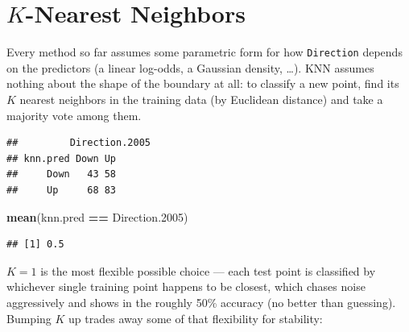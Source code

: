\documentclass[
  11pt,
]{article}
\newenvironment{Shaded}{\begin{snugshade}}{\end{snugshade}}
\newcommand{\AttributeTok}[1]{\textcolor[rgb]{0.13,0.29,0.53}{#1}}
\newcommand{\DecValTok}[1]{\textcolor[rgb]{0.00,0.00,0.81}{#1}}
\newcommand{\FloatTok}[1]{\textcolor[rgb]{0.00,0.00,0.81}{#1}}
\newcommand{\FunctionTok}[1]{\textcolor[rgb]{0.13,0.29,0.53}{\textbf{#1}}}
\newcommand{\NormalTok}[1]{#1}
\newcommand{\OtherTok}[1]{\textcolor[rgb]{0.56,0.35,0.01}{#1}}
\newcommand{\SpecialCharTok}[1]{\textcolor[rgb]{0.81,0.36,0.00}{\textbf{#1}}}
\begin{document}
\section{\texorpdfstring{\(K\)-Nearest
Neighbors}{K-Nearest Neighbors}}\label{k-nearest-neighbors}

Every method so far assumes some parametric form for how
\texttt{Direction} depends on the predictors (a linear log-odds, a
Gaussian density, \ldots). KNN assumes nothing about the shape of the
boundary at all: to classify a new point, find its \(K\) nearest
neighbors in the training data (by Euclidean distance) and take a
majority vote among them.

\begin{Shaded}
\end{Shaded}

\begin{verbatim}
##         Direction.2005
## knn.pred Down Up
##     Down   43 58
##     Up     68 83
\end{verbatim}

\begin{Shaded}
\begin{Highlighting}[]
\FunctionTok{mean}\NormalTok{(knn.pred }\SpecialCharTok{==}\NormalTok{ Direction}\FloatTok{.2005}\NormalTok{)}
\end{Highlighting}
\end{Shaded}

\begin{verbatim}
## [1] 0.5
\end{verbatim}

\(K=1\) is the most flexible possible choice --- each test point is
classified by whichever single training point happens to be closest,
which chases noise aggressively and shows in the roughly 50\% accuracy
(no better than guessing). Bumping \(K\) up trades away some of that
flexibility for stability:
\end{document}
